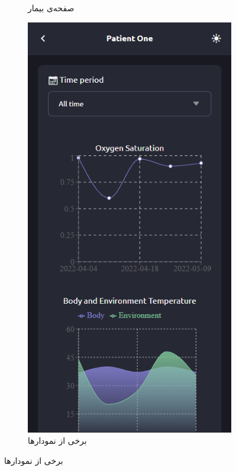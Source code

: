 \begin{figure}[H]
\begin{center}
\begin{subfigure}{.24\textwidth}
			\caption{صفحه‌ی بیمار}
			\label{patients_screen}
		\end{subfigure}
		\begin{subfigure}{.24\textwidth}
			\includegraphics[width=.95\linewidth]{figs/app_charts1}
			\caption{برخی از نمودارها}
			\label{initial_charts}
		\end{subfigure}

\end{center}
\end{figure}

